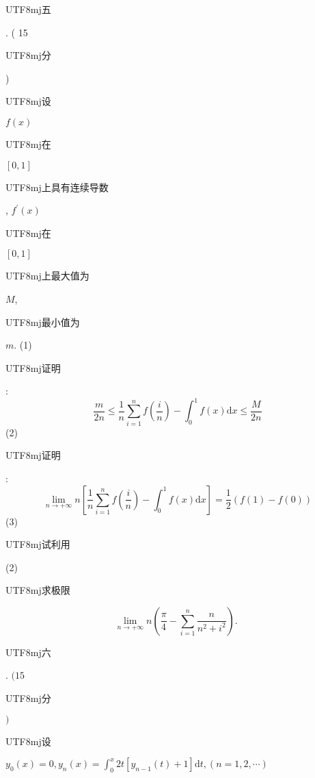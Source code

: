 \documentclass[10pt]{article}
\begin{document}
\begin{CJK}{UTF8}{mj}五\end{CJK}. ( 15 \begin{CJK}{UTF8}{mj}分\end{CJK}) \begin{CJK}{UTF8}{mj}设\end{CJK} $f(x)$ \begin{CJK}{UTF8}{mj}在\end{CJK} $[0,1]$ \begin{CJK}{UTF8}{mj}上具有连续导数\end{CJK}, $f^{\prime}(x)$ \begin{CJK}{UTF8}{mj}在\end{CJK} $[0,1]$ \begin{CJK}{UTF8}{mj}上最大值为\end{CJK} $M$, \begin{CJK}{UTF8}{mj}最小值为\end{CJK} $m$. (1) \begin{CJK}{UTF8}{mj}证明\end{CJK}:
$$
\frac{m}{2 n} \leqslant \frac{1}{n} \sum_{i=1}^{n} f\left(\frac{i}{n}\right)-\int_{0}^{1} f(x) \mathrm{d} x \leqslant \frac{M}{2 n}
$$
(2) \begin{CJK}{UTF8}{mj}证明\end{CJK}:
$$
\lim _{n \rightarrow+\infty} n\left[\frac{1}{n} \sum_{i=1}^{n} f\left(\frac{i}{n}\right)-\int_{0}^{1} f(x) \mathrm{d} x\right]=\frac{1}{2}(f(1)-f(0))
$$
(3) \begin{CJK}{UTF8}{mj}试利用\end{CJK} (2) \begin{CJK}{UTF8}{mj}求极限\end{CJK}
$$
\lim _{n \rightarrow+\infty} n\left(\frac{\pi}{4}-\sum_{i=1}^{n} \frac{n}{n^{2}+i^{2}}\right) \text {. }
$$
\begin{CJK}{UTF8}{mj}六\end{CJK}. $(15$ \begin{CJK}{UTF8}{mj}分\end{CJK} $)$ \begin{CJK}{UTF8}{mj}设\end{CJK} $y_{0}(x)=0, y_{n}(x)=\int_{0}^{x} 2 t\left[y_{n-1}(t)+1\right] \mathrm{d} t,(n=1,2, \cdots)$
\end{document}
